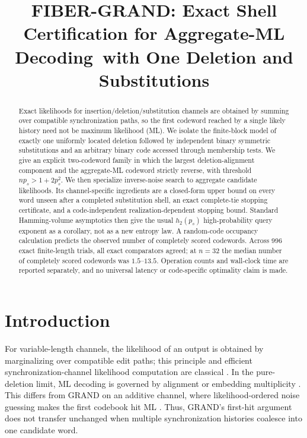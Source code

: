 \documentclass[conference]{IEEEtran}
\title{FIBER-GRAND: Exact Shell Certification for Aggregate-ML Decoding\
with One Deletion and Substitutions}
\author{\IEEEauthorblockN{Ali Fazeli}
\IEEEauthorblockA{Department of Electrical and Computer Engineering\\
University of Toronto, Toronto, Canada}}
\begin{document}
\maketitle

\begin{abstract}
Exact likelihoods for insertion/deletion/substitution channels are obtained by summing over
compatible synchronization paths, so the first codeword reached by a single likely history need
not be maximum likelihood (ML). We isolate the finite-block model of exactly one uniformly located
deletion followed by independent binary symmetric substitutions and an arbitrary binary code
accessed through membership tests. We give an explicit two-codeword family in which the largest
deletion-alignment component and the aggregate-ML codeword strictly reverse, with threshold
$np_s>1+2p_s^2$. We then specialize inverse-noise search to aggregate candidate likelihoods. Its
channel-specific ingredients are a closed-form upper bound on every word unseen after a completed
substitution shell, an exact complete-tie stopping certificate, and a code-independent
realization-dependent stopping bound. Standard Hamming-volume asymptotics then give the usual
$h_2(p_s)$ high-probability query exponent as a corollary, not as a new entropy law. A random-code
occupancy calculation predicts the observed number of completely scored codewords. Across 996 exact
finite-length trials, all exact comparators agreed; at $n=32$ the median number of completely scored
codewords was $1.5$--$13.5$. Operation counts and wall-clock time are reported separately, and no
universal latency or code-specific optimality claim is made.
\end{abstract}

\section{Introduction}
For variable-length channels, the likelihood of an output is obtained by marginalizing over
compatible edit paths; this principle and efficient synchronization-channel likelihood computation
are classical \cite{bahl1975decoding,davey2001reliable}. In the pure-deletion limit, ML decoding is
governed by alignment or embedding multiplicity \cite{sabary2020error}. This differs from GRAND on
an additive channel, where likelihood-ordered noise guessing makes the first codebook hit ML
\cite{duffy2019grand}. Thus, GRAND's first-hit argument does not transfer unchanged when multiple
synchronization histories coalesce into one candidate word.
\end{document}
